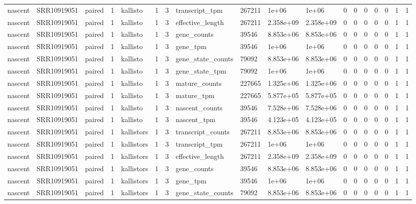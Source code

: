 \begin{tabular}{llllllllllllllllll}
nascent & SRR10919051 & paired & 1 & kallisto & 1 & 3 & transcript\_tpm & 267211 & 1e+06 & 1e+06 & 0 & 0 & 0 & 0 & 0 & 1 & 1 \\
nascent & SRR10919051 & paired & 1 & kallisto & 1 & 3 & effective\_length & 267211 & 2.358e+09 & 2.358e+09 & 0 & 0 & 0 & 0 & 0 & 1 & 1 \\
nascent & SRR10919051 & paired & 1 & kallisto & 1 & 3 & gene\_counts & 39546 & 8.853e+06 & 8.853e+06 & 0 & 0 & 0 & 0 & 0 & 1 & 1 \\
nascent & SRR10919051 & paired & 1 & kallisto & 1 & 3 & gene\_tpm & 39546 & 1e+06 & 1e+06 & 0 & 0 & 0 & 0 & 0 & 1 & 1 \\
nascent & SRR10919051 & paired & 1 & kallisto & 1 & 3 & gene\_state\_counts & 79092 & 8.853e+06 & 8.853e+06 & 0 & 0 & 0 & 0 & 0 & 1 & 1 \\
nascent & SRR10919051 & paired & 1 & kallisto & 1 & 3 & gene\_state\_tpm & 79092 & 1e+06 & 1e+06 & 0 & 0 & 0 & 0 & 0 & 1 & 1 \\
nascent & SRR10919051 & paired & 1 & kallisto & 1 & 3 & mature\_counts & 227665 & 1.325e+06 & 1.325e+06 & 0 & 0 & 0 & 0 & 0 & 1 & 1 \\
nascent & SRR10919051 & paired & 1 & kallisto & 1 & 3 & mature\_tpm & 227665 & 5.877e+05 & 5.877e+05 & 0 & 0 & 0 & 0 & 0 & 1 & 1 \\
nascent & SRR10919051 & paired & 1 & kallisto & 1 & 3 & nascent\_counts & 39546 & 7.528e+06 & 7.528e+06 & 0 & 0 & 0 & 0 & 0 & 1 & 1 \\
nascent & SRR10919051 & paired & 1 & kallisto & 1 & 3 & nascent\_tpm & 39546 & 4.123e+05 & 4.123e+05 & 0 & 0 & 0 & 0 & 0 & 1 & 1 \\
nascent & SRR10919051 & paired & 1 & kallistors & 1 & 3 & transcript\_counts & 267211 & 8.853e+06 & 8.853e+06 & 0 & 0 & 0 & 0 & 0 & 1 & 1 \\
nascent & SRR10919051 & paired & 1 & kallistors & 1 & 3 & transcript\_tpm & 267211 & 1e+06 & 1e+06 & 0 & 0 & 0 & 0 & 0 & 1 & 1 \\
nascent & SRR10919051 & paired & 1 & kallistors & 1 & 3 & effective\_length & 267211 & 2.358e+09 & 2.358e+09 & 0 & 0 & 0 & 0 & 0 & 1 & 1 \\
nascent & SRR10919051 & paired & 1 & kallistors & 1 & 3 & gene\_counts & 39546 & 8.853e+06 & 8.853e+06 & 0 & 0 & 0 & 0 & 0 & 1 & 1 \\
nascent & SRR10919051 & paired & 1 & kallistors & 1 & 3 & gene\_tpm & 39546 & 1e+06 & 1e+06 & 0 & 0 & 0 & 0 & 0 & 1 & 1 \\
nascent & SRR10919051 & paired & 1 & kallistors & 1 & 3 & gene\_state\_counts & 79092 & 8.853e+06 & 8.853e+06 & 0 & 0 & 0 & 0 & 0 & 1 & 1 \\

\end{tabular}
